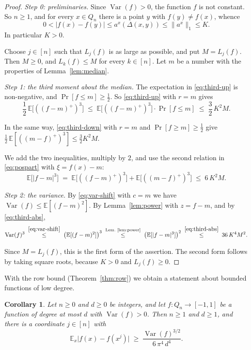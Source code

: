\documentclass[11pt,reqno]{amsart}
\newtheorem{corollary}[theorem]{Corollary}
\theoremstyle{definition}
\theoremstyle{remark}
\numberwithin{equation}{section}
\theoremstyle{named}
\theoremstyle{plain}
\newcommand{\E}{\mathbb{E}}
\newcommand{\Var}{\operatorname{Var}}
\newcommand{\norm}[1]{\lVert #1\rVert_1}
\newcommand{\abs}[1]{\lvert #1\rvert}
\begin{document}
\begin{proof}
\emph{Step 0: preliminaries.} Since $\Var(f)>0$, the function $f$ is not constant. So $n\ge1$, and
for every $x\in Q_n$ there is a point $y$ with $f(y)\ne f(x)$, whence
\begin{equation}\label{eq:a-pos}
   0<\abs{f(x)-f(y)}\le a^{x}(\Delta(x,y))\le\norm{a^{x}}\le K .
\end{equation}
In particular $K>0$.

Choose $j\in[n]$ such that $L_j(f)$ is as large as possible, and put
$M=L_j(f)$. Then $M\ge0$, and $L_k(f)\le M$ for every $k\in[n]$. Let $m$ be a number with the
properties of Lemma~\ref{lem:median}.

\smallskip
\emph{Step 1: the third moment about the median.} The expectation in \eqref{eq:third-up} is
non-negative, and $\Pr[f\le m]\ge\frac12$. So \eqref{eq:third-up} with $r=m$ gives
\[
   \frac12\,\E\bigl[((f-m)^{+})^{3}\bigr]\;\le\;
   \E\bigl[((f-m)^{+})^{3}\bigr]\cdot\Pr[f\le m]\;\le\;\frac32\,K^{2}M .
\]

In the same way, \eqref{eq:third-down} with $r=m$ and $\Pr[f\ge m]\ge\frac12$ give
$\frac12\,\E[((m-f)^{+})^{3}]\le\frac32K^{2}M$.

We add the two inequalities, multiply by $2$, and
use the second relation in \eqref{eq:pospart} with $\xi=f(x)-m$:
\begin{equation}\label{eq:third-abs}
   \E\bigl[\abs{f-m}^{3}\bigr]\;=\;\E\bigl[((f-m)^{+})^{3}\bigr]+\E\bigl[((m-f)^{+})^{3}\bigr]
   \;\le\;6\,K^{2}M .
\end{equation}

\smallskip
\emph{Step 2: the variance.} By \eqref{eq:var-shift} with $c=m$ we have
$\Var(f)\le\E[(f-m)^{2}]$. By Lemma~\ref{lem:power} with $z=f-m$, and by \eqref{eq:third-abs},
\[
   \Var(f)^{3}\;\overset{\eqref{eq:var-shift}}{\le}\;\bigl(\E[(f-m)^{2}]\bigr)^{3}
   \;\overset{\text{Lem.~\ref{lem:power}}}{\le}\;\bigl(\E[\abs{f-m}^{3}]\bigr)^{2}
   \;\overset{\eqref{eq:third-abs}}{\le}\;36\,K^{4}M^{2} .
\]

Since $M=L_j(f)$, this is the first form of the assertion. The second form follows by taking
square roots, because $K>0$ and $L_j(f)\ge0$.
\end{proof}

With the row bound (Theorem~\ref{thm:row}) we obtain a statement about bounded functions of low
degree.

\begin{corollary}\label{cor:incr-degree}
Let $n\ge0$ and $d\ge0$ be integers, and let $f\colon Q_n\to[-1,1]$ be a function of degree at
most $d$ with $\Var(f)>0$. Then $n\ge1$ and $d\ge1$, and there is a coordinate $j\in[n]$ with
\[
   \E_x\abs{f(x)-f(x^{j})}\;\ge\;\frac{\Var(f)^{3/2}}{6\,\pi^{4}\,d^{4}} .
\]
\end{corollary}
\end{document}
